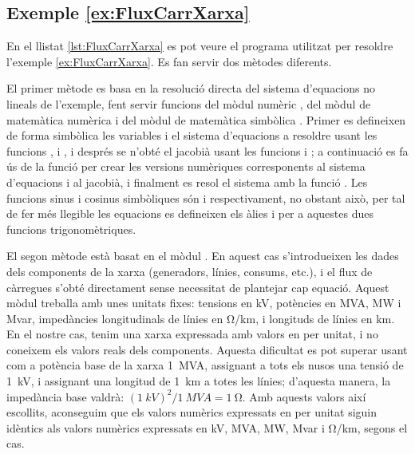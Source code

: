 \hypertarget{exemple:FluxCarrXarxa}{\subsection{Exemple \ref*{ex:FluxCarrXarxa} \FluxCarrXarxa}}
En el llistat \vref{lst:FluxCarrXarxa} es pot veure el programa utilitzat per resoldre l'exemple \vref{ex:FluxCarrXarxa}. Es fan servir dos mètodes diferents.

El primer mètode es basa en la resolució directa del sistema d'equacions no lineals de l'exemple, fent servir funcions del mòdul numèric , del mòdul de matemàtica numèrica  i del mòdul de matemàtica simbòlica . Primer es defineixen de forma simbòlica les variables i el sistema d'equacions a resoldre usant les funcions ,  i , i després se n'obté el jacobià usant les funcions  i ; a continuació es fa ús de la funció   per crear les versions numèriques corresponents al sistema d'equacions i al jacobià, i finalment es resol el sistema amb la funció . Les funcions sinus i cosinus simbòliques són   i   respectivament, no obstant això,  per tal de fer més llegible les equacions es defineixen els àlies  i  per a aquestes dues funcions trigonomètriques.

El segon mètode està basat en el mòdul . En aquest cas s'introdueixen les dades dels components de la xarxa (generadors, línies, consums, etc.), i el flux de càrregues s'obté directament sense necessitat de plantejar cap equació. Aquest mòdul treballa amb unes unitats fixes: tensions en  \unit{kV}, potències en  \unit{MVA}, \unit{MW} i \unit{Mvar}, impedàncies longitudinals de línies en \unit{\ohm/km}, i longituds de línies en  \unit{km}. En el nostre cas, tenim una xarxa expressada amb valors en per unitat, i no coneixem els valors reals dels components. Aquesta dificultat es pot superar usant com a potència base de la xarxa \qty{1}{MVA}, assignant a tots els nusos una tensió de \qty{1}{kV}, i assignant una longitud de \qty{1}{km} a totes les línies; d'aquesta manera, la impedància base valdrà: $(\qty{1}{kV})^2/\qty{1}{MVA} = \qty{1}{\ohm}$. Amb aquests valors així escollits, aconseguim que els valors numèrics expressats en per unitat siguin idèntics als valors numèrics expressats en 
\unit{kV},  \unit{MVA}, \unit{MW}, \unit{Mvar} i \unit{\ohm/km}, segons el cas.


